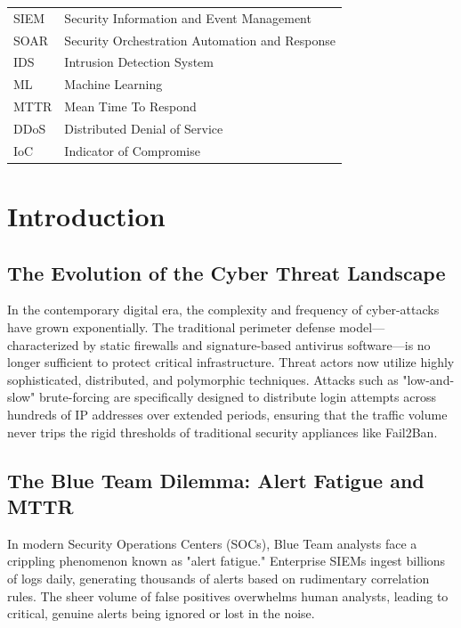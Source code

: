 \documentclass[12pt, a4paper]{report}
\begin{document}
	\begin{tabular}{ll}
		SIEM & Security Information and Event Management \\
		SOAR & Security Orchestration Automation and Response \\
		IDS & Intrusion Detection System \\
		ML & Machine Learning \\
		MTTR & Mean Time To Respond \\
		DDoS & Distributed Denial of Service \\
		IoC & Indicator of Compromise \\
	\end{tabular}
	
	
	\chapter{Introduction}
	\onehalfspacing
	
	\section*{The Evolution of the Cyber Threat Landscape}
	In the contemporary digital era, the complexity and frequency of cyber-attacks have grown exponentially. The traditional perimeter defense model—characterized by static firewalls and signature-based antivirus software—is no longer sufficient to protect critical infrastructure. Threat actors now utilize highly sophisticated, distributed, and polymorphic techniques. Attacks such as "low-and-slow" brute-forcing are specifically designed to distribute login attempts across hundreds of IP addresses over extended periods, ensuring that the traffic volume never trips the rigid thresholds of traditional security appliances like Fail2Ban.
	
	\section*{The Blue Team Dilemma: Alert Fatigue and MTTR}
	In modern Security Operations Centers (SOCs), Blue Team analysts face a crippling phenomenon known as "alert fatigue." Enterprise SIEMs ingest billions of logs daily, generating thousands of alerts based on rudimentary correlation rules. The sheer volume of false positives overwhelms human analysts, leading to critical, genuine alerts being ignored or lost in the noise. 
	
\end{document}
